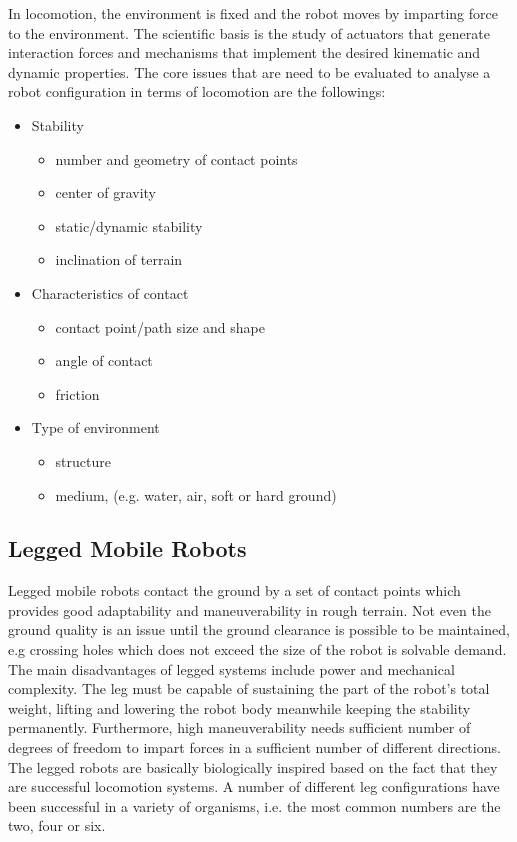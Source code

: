 \documentclass[12pt,english]{article}
\begin{document}
In locomotion, the environment is fixed and the robot moves by imparting force to the environment. The scientific basis is the study of actuators that generate interaction forces and mechanisms that implement the desired kinematic and dynamic properties. The core issues that are need to be evaluated to analyse a robot configuration in terms of locomotion are the followings:
\begin{itemize}
	\item Stability
		\begin{itemize}
			\item number and geometry of contact points
			\item center of gravity
			\item static/dynamic stability
			\item inclination of terrain
		\end{itemize}
	\item Characteristics of contact
		\begin{itemize}
			\item contact point/path size and shape
			\item angle of contact
			\item friction
		\end{itemize}
	\item Type of environment
	\begin{itemize}
		\item structure
		\item medium, (e.g. water, air, soft or hard ground)
	\end{itemize}

\end{itemize}


\subsection{Legged Mobile Robots}
Legged mobile robots contact the ground by a set of contact points which provides good adaptability and maneuverability in rough terrain. Not even the ground quality is an issue until the ground clearance is possible to be maintained, e.g crossing holes which does not exceed the size of the robot is solvable demand. The main disadvantages of legged systems include power and mechanical complexity. The leg must be capable of sustaining the part of the robot’s total weight, lifting and lowering the robot body meanwhile keeping the stability permanently. Furthermore, high maneuverability needs sufficient number of degrees of freedom to impart forces in a sufficient number of different directions.
The legged robots are basically biologically inspired based on the fact that they are successful locomotion systems. A number of different leg configurations have been successful in a variety of organisms, i.e. the most common numbers are the two, four or six.
\end{document}
